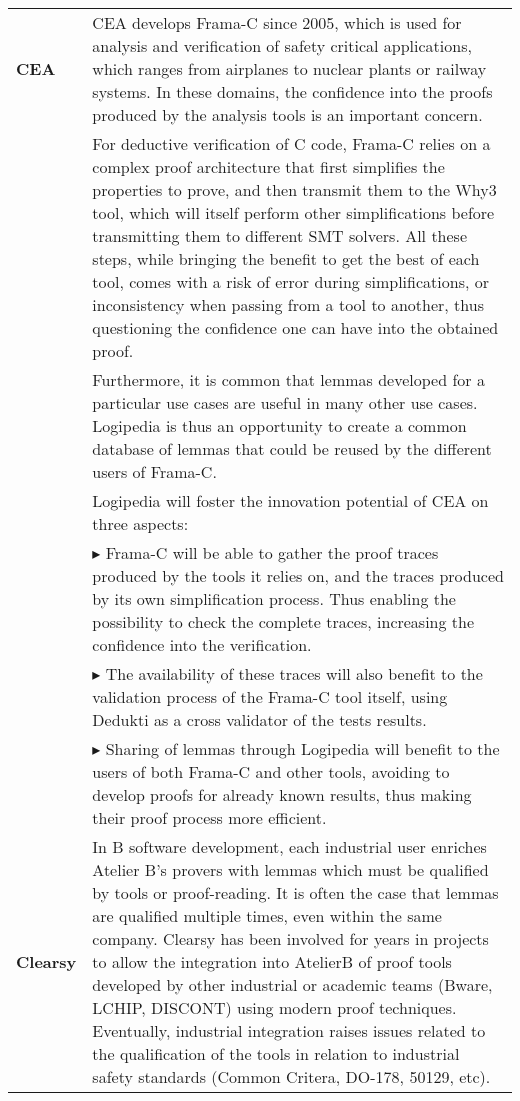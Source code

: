\begin{longtable}{|p{}|p{}|}
\hline
{\bf CEA}
&
CEA develops Frama-C since 2005, which is used for analysis and
verification of safety critical applications, which ranges from airplanes
to nuclear plants or railway systems. In these domains, the confidence
into the proofs produced by the analysis tools is an important concern.
\\

&
\hspace{0.4cm}
For deductive verification of C code, Frama-C relies on
a complex proof architecture that first simplifies the properties to prove,
and then transmit them to the Why3 tool, which will itself perform other
simplifications before transmitting them to different SMT solvers. All
these steps, while bringing the benefit to get the best of each tool, comes
with a risk of error during simplifications, or inconsistency when passing
from a tool to another, thus questioning the confidence one can have into
the obtained proof.
\\

&
\hspace{0.4cm}
Furthermore, it is common that lemmas developed for a particular use
cases are useful in many other use cases. Logipedia is thus an opportunity
to create a common database of lemmas that could be reused by the different
users of Frama-C.
\\

&
\hspace{0.4cm}
Logipedia will foster the innovation potential of CEA on three aspects:
\\

& $\blacktriangleright$ Frama-C will be able to gather the proof
traces produced by the tools it relies on, and the traces produced by
its own simplification process. Thus enabling the possibility to check
the complete traces, increasing the confidence into the verification.\\
& $\blacktriangleright$ The availability of these traces will also
benefit to the validation process of the Frama-C tool itself, using
Dedukti as a cross validator of the tests results.\\
& $\blacktriangleright$ Sharing of lemmas through Logipedia will
benefit to the users of both Frama-C and other tools, avoiding to
develop proofs for already known results, thus making their proof
process more efficient.

\\
\hline
{\bf Clearsy}
&
In B software development, each
industrial user enriches Atelier B's provers with lemmas which must be
qualified by tools or proof-reading.  It is often the case that lemmas
are qualified multiple times, even within the same company.  Clearsy
has been involved for years in projects to allow the integration into
AtelierB of proof tools developed by other industrial or academic teams
(Bware, LCHIP, DISCONT) using modern proof techniques.  Eventually,
industrial integration raises issues related to the qualification of
the tools in relation to industrial safety standards (Common Critera,
DO-178, 50129, etc).
\\


\end{longtable}
